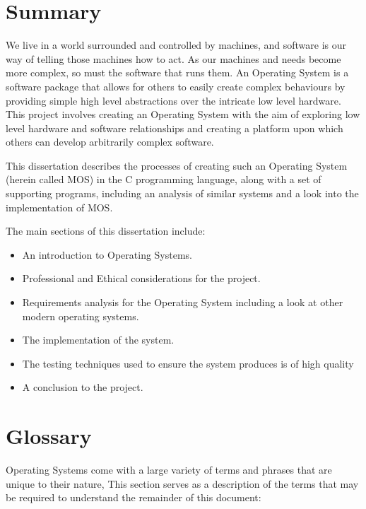 \documentclass[a4paper]{report}
\begin{document}
\clearpage
\section*{Summary}


We live in a world surrounded and controlled by machines, and software is our way of telling those machines how to act. As our machines and needs become more complex, so must the software that runs them. An Operating System is a software package that allows for others to easily create complex behaviours by providing simple high level abstractions over the intricate low level hardware. This project involves creating an Operating System with the aim of exploring low level hardware and software relationships and creating a platform upon which others can develop arbitrarily complex software.

This dissertation describes the processes of creating such an Operating System (herein called MOS) in the C programming language, along with a set of supporting programs, including an analysis of similar systems and a look into the implementation of MOS.

The main sections of this dissertation include:
\begin{itemize}
\item An introduction to Operating Systems.
\item Professional and Ethical considerations for the project.
\item Requirements analysis for the Operating System including a look at other modern operating systems.
\item The implementation of the system.
\item The testing techniques used to ensure the system produces is of high quality
\item A conclusion to the project.
\end{itemize}




\tableofcontents
\listoffigures

\clearpage

\section{Glossary}

Operating Systems come with a large variety of terms and phrases that are unique to their nature, This section serves as a description of the terms that may be required to understand the remainder of this document:
\end{document}
